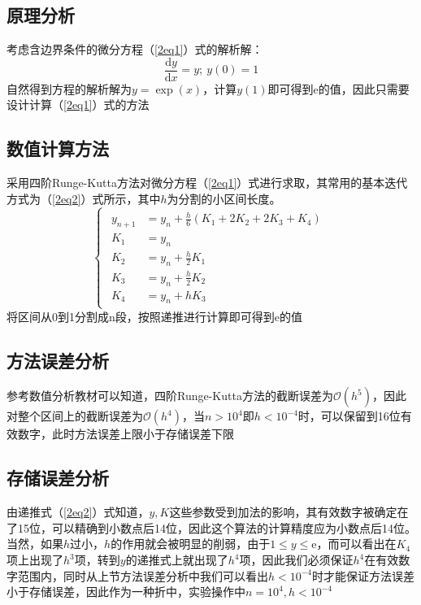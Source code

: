 \documentclass[onecolumn,compsoc]{IEEEtran}
\renewcommand{\d}{\mathrm{d}}
\renewcommand{\|}{\Bigg |}
\newcommand{\e}{\mathrm{e}}
\begin{document}
\subsection{原理分析}
考虑含边界条件的微分方程（\ref{2eq1}）式的解析解：
\begin{equation}\label{2eq1}
\frac{\d y}{\d x} = y;\  y(0) = 1
\end{equation}
自然得到方程的解析解为$y = \exp(x)$，计算$y(1)$即可得到e的值，因此只需要设计计算（\ref{2eq1}）式的方法
\subsection{数值计算方法}
采用四阶Runge-Kutta方法对微分方程（\ref{2eq1}）式进行求取，其常用的基本迭代方式为（\ref{2eq2}）式所示，其中$h$为分割的小区间长度。
\begin{equation}\label{2eq2}\begin{cases}\begin{aligned}
y_{n+1} &= y_n + \frac{h}{6}(K_1+2K_2+2K_3+K_4)\\
K_1 &= y_n\\
K_2 &= y_n + \frac{h}{2}K_1 \\
K_3 &= y_n + \frac{h}{2}K_2 \\
K_4 &= y_n + hK_3
\end{aligned}\end{cases}\end{equation}
将区间从0到1分割成n段，按照递推进行计算即可得到e的值
\subsection{方法误差分析}
参考数值分析教材可以知道，四阶Runge-Kutta方法的截断误差为$\mathcal{O}(h^5)$，因此对整个区间上的截断误差为$\mathcal{O}(h^4)$，当$n >10^4$即$h < 10^{-4}$时，可以保留到16位有效数字，此时方法误差上限小于存储误差下限
\subsection{存储误差分析}
由递推式（\ref{2eq2}）式知道，$y,K$这些参数受到加法的影响，其有效数字被确定在了15位，可以精确到小数点后14位，因此这个算法的计算精度应为小数点后14位。当然，如果$h$过小，$h$的作用就会被明显的削弱，由于$1 \le y \le \e$，而可以看出在$K_4$项上出现了$h^3$项，转到$y$的递推式上就出现了$h^4$项，因此我们必须保证$h^4$在有效数字范围内，同时从上节方法误差分析中我们可以看出$h < 10^{-4}$时才能保证方法误差小于存储误差，因此作为一种折中，实验操作中$n = 10^4,h < 10^{-4}$
\end{document}

